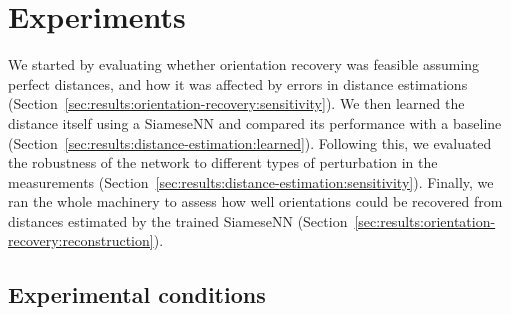 \section{Experiments}\label{sec:experiments}



We started by evaluating whether orientation recovery was feasible assuming perfect distances, and how it was affected by errors in distance estimations (Section~\ref{sec:results:orientation-recovery:sensitivity}).
We then learned the distance itself using a SiameseNN and compared its performance with a baseline (Section~\ref{sec:results:distance-estimation:learned}).
Following this, we evaluated the robustness of the network to different types of perturbation in the measurements (Section~\ref{sec:results:distance-estimation:sensitivity}).
Finally, we ran the whole machinery to assess how well orientations could be recovered from distances estimated by the trained SiameseNN (Section~\ref{sec:results:orientation-recovery:reconstruction}).


\subsection{Experimental conditions}\label{sec:results:data}

